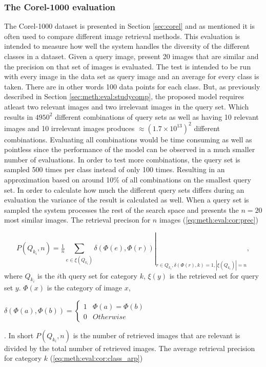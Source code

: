 \subsubsection{The Corel-1000 evaluation}
\label{sec:meth:eval:studycomp:corel}

The Corel-1000 dataset is presented in Section \ref{sec:corel} and as mentioned it is often used to compare different image retrieval methods. This evaluation is intended to measure how well the system handles the diversity of the different classes in a dataset. Given a query image, present 20 images that are similar and the precision on that set of images is evaluated. The test is intended to be run with every image in the data set as query image and an average for every class is taken. There are in other words 100 data points for each class. But, as previously described in Section \ref{sec:meth:eval:studycomp}, the proposed model requires atleast two relevant images and two irrelevant images in the query set. Which results in $4950^2$ different combinations of query sets as well as having 10 relevant images and 10 irrelevant images produces $\approx (1.7\times 10^{13})^2$ different combinations. Evaluating all combinations would be time consuming as well as pointless since the performance of the model can be observed in a much smaller number of evaluations. In order to test more combinations, the query set is sampled 500 times per class instead of only 100 times. Resulting in an approximation based on around 10\% of all combinations on the smallest query set. In order to calculate how much the different query sets differs during an evaluation the variance of the result is calculated as well. When a query set is sampled the system processes the rest of the search space and presents the $n=20$ most similar images. The retrieval precison for $n$ images (\ref{eq:meth:eval:cor:prec})

\begin{equation}
\label{eq:meth:eval:cor:prec}
P(Q_{k_i}, n) = \left . \tfrac{1}{n}\sum_{e \in \xi(Q_{k_i})} \delta(\Phi(e), \Phi(r)) \right |_{ r \in Q_{k_i},  \delta(\Phi(r), k)=1, |\xi(Q_{k_i})|=n},
\end{equation}
where $Q_{k_i}$ is the $i$th query set for category $k$, $\xi(y)$ is the retrieved set for query set $y$. $\Phi(x)$ is the category of image $x$, \begin{tiny}$\delta(\Phi(a), \Phi(b)) = \left \{ 
\begin{matrix} 
1 & \Phi(a) = \Phi(b) \\
0 & Otherwise
\end{matrix}\right.$\end{tiny}.
 In short $P(Q_{k_i}, n)$ is the number of retrieved images that are relevant is divided by the total number of retrieved images. 
 The average retrieval precision for category $k$ (\ref{eq:meth:eval:cor:class_arp}) 


